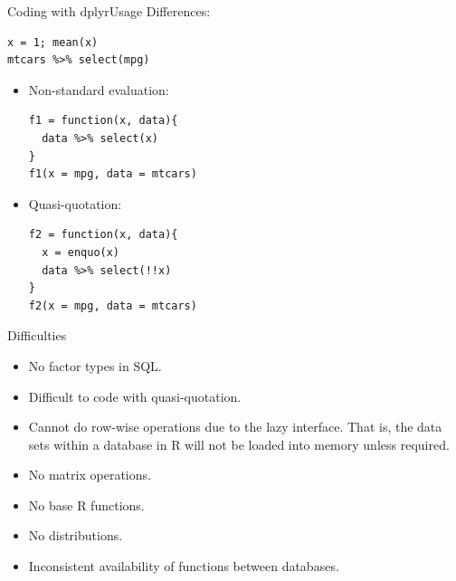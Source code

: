 \documentclass{beamer}
\begin{document}
\begin{frame}[fragile]{Coding with dplyr}{Usage}
Differences:\\
\begin{lstlisting}
x = 1; mean(x)
mtcars %>% select(mpg)
\end{lstlisting}
  \begin{itemize}
  \item { Non-standard evaluation:\\
     \begin{lstlisting}
f1 = function(x, data){
  data %>% select(x)
}
f1(x = mpg, data = mtcars)
    \end{lstlisting}
  }
  
  \pause
  
  \item {Quasi-quotation:\\
     \begin{lstlisting}
f2 = function(x, data){
  x = enquo(x)
  data %>% select(!!x)
}
f2(x = mpg, data = mtcars)
    \end{lstlisting}
  }
  \end{itemize}
\end{frame}


\begin{frame}{Difficulties}
  \begin{itemize}
    \item No factor types in {\sf SQL}.
    \item Difficult to code with quasi-quotation.
    \item Cannot do row-wise operations due to the lazy interface. That is, the data sets within a database in {\sf R} will not be loaded into memory unless required.
    \item No matrix operations.
    \item No base {\sf R} functions. 
    \item No distributions.
    \item Inconsistent availability of functions between databases.
  \end{itemize}
\end{frame}
\end{document}
